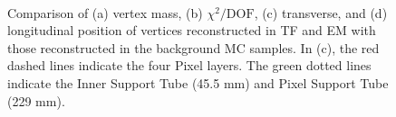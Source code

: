 \begin{figure}[!htb]
    \centering
     \\
    \caption{Comparison of (a) vertex mass, (b) $\chi^{2} / \mathrm{DOF}$, (c) transverse, and (d) longitudinal position of \xx vertices reconstructed in TF and EM with those reconstructed in the background MC samples. In (c), the red dashed lines indicate the four Pixel layers. The green dotted lines indicate the Inner Support Tube (45.5 mm) and Pixel Support Tube (229 mm).}
    \label{fig:random-crossing_vertex_dist}
\end{figure}


